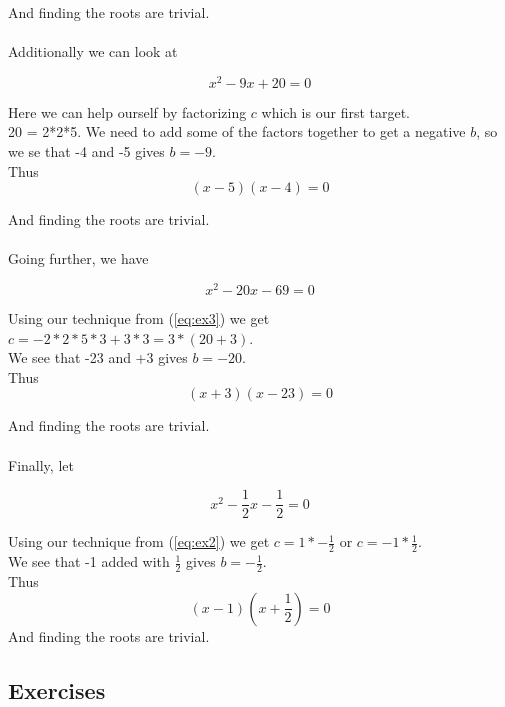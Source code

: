 \documentclass[a4paper]{article}
\begin{document}
And finding the roots are trivial.\\ \\
Additionally we can look at

\begin{equation}  \label{eq:ex3}
	x^2 - 9x + 20 = 0
\end{equation}

Here we can help ourself by factorizing $c$ which is our first target.\\ 20 = 2*2*5. We need to add some of the factors together to get a negative $b$, so we se that -4 and -5 gives $b=-9$.\\ Thus
\begin{equation} \label{eq:ex31}
 (x-5)(x-4) = 0
\end{equation}

And finding the roots are trivial.\\ \\
Going further, we have

\begin{equation}  \label{eq:ex4}
	x^2 - 20x - 69 = 0
\end{equation}

Using our technique from (\ref{eq:ex3}) we get $c=-2*2*5*3+3*3 = 3*(20+3)$.\\ We see that -23 and +3 gives $b=-20$.\\ 
Thus
\begin{equation} \label{eq:ex41}
 (x+3)(x-23) = 0
\end{equation}

And finding the roots are trivial.\\ \\
Finally, let

\begin{equation}  \label{eq:ex5}
	x^2 - \frac{1}{2}x - \frac{1}{2} = 0
\end{equation}

Using our technique from (\ref{eq:ex2}) we get $c=1*- \frac{1}{2}$ or $c= -1*\frac{1}{2}$.\\ We see that -1 added with $\frac{1}{2}$ gives $b=-\frac{1}{2}$.\\ 
Thus
\begin{equation} \label{eq:ex51}
 (x-1)(x+\frac{1}{2}) = 0
\end{equation}
And finding the roots are trivial.

\newpage

\subsection{Exercises}
\end{document}
